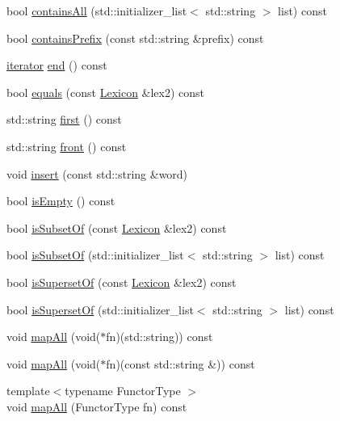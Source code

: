 \begin{DoxyCompactItemize}
\item 
bool \mbox{\hyperlink{classLexicon_a3934298595e72e6540e5f81d47ab763a}{contains\+All}} (std\+::initializer\+\_\+list$<$ std\+::string $>$ list) const
\item 
bool \mbox{\hyperlink{classLexicon_a0b8e0b0b6f72ba6b88b56bd074b1dc32}{contains\+Prefix}} (const std\+::string \&prefix) const
\item 
\mbox{\hyperlink{classLexicon_1_1iterator}{iterator}} \mbox{\hyperlink{classLexicon_a68b688a51bd0cf6fb5bc2cba292209a8}{end}} () const
\item 
bool \mbox{\hyperlink{classLexicon_a7dd6de171cb80bc7e2b48d53bd1e9276}{equals}} (const \mbox{\hyperlink{classLexicon}{Lexicon}} \&lex2) const
\item 
std\+::string \mbox{\hyperlink{classLexicon_aba89eab0637bde14f9ded33e9e9c6aa5}{first}} () const
\item 
std\+::string \mbox{\hyperlink{classLexicon_a054217ec9f3229ceedee9d7bde075587}{front}} () const
\item 
void \mbox{\hyperlink{classLexicon_a1a017af6eb755b5c83e70f61e2bda2c7}{insert}} (const std\+::string \&word)
\item 
bool \mbox{\hyperlink{classLexicon_acf82f9b2937375c7b1cf3dccb3df3312}{is\+Empty}} () const
\item 
bool \mbox{\hyperlink{classLexicon_a6c118f41dad8941a624c3ff479987e3d}{is\+Subset\+Of}} (const \mbox{\hyperlink{classLexicon}{Lexicon}} \&lex2) const
\item 
bool \mbox{\hyperlink{classLexicon_a2a0f1241b53bcf0b31103b79cb01b87d}{is\+Subset\+Of}} (std\+::initializer\+\_\+list$<$ std\+::string $>$ list) const
\item 
bool \mbox{\hyperlink{classLexicon_ad6a4796a72905df1e33f4b100cb91f32}{is\+Superset\+Of}} (const \mbox{\hyperlink{classLexicon}{Lexicon}} \&lex2) const
\item 
bool \mbox{\hyperlink{classLexicon_a217cbc1e6ba9f694645608c8a17c1943}{is\+Superset\+Of}} (std\+::initializer\+\_\+list$<$ std\+::string $>$ list) const
\item 
void \mbox{\hyperlink{classLexicon_a2e4e14ffb291ba4d5475b9b66d2a12c8}{map\+All}} (void($\ast$fn)(std\+::string)) const
\item 
void \mbox{\hyperlink{classLexicon_abab83598d63d43b15cf018fa020e1ddf}{map\+All}} (void($\ast$fn)(const std\+::string \&)) const
\item 
{\footnotesize template$<$typename Functor\+Type $>$ }\\void \mbox{\hyperlink{classLexicon_a8dc32c1e45704cfae41daf8adb4e66dc}{map\+All}} (Functor\+Type fn) const

\end{DoxyCompactItemize}
